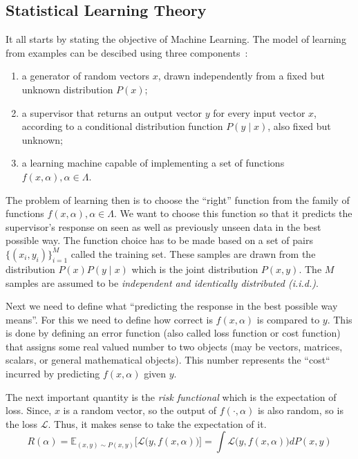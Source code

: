 \documentclass[11pt]{article}
\begin{document}
\subsection{Statistical Learning Theory}
It all starts by stating the objective of Machine Learning. The model of
learning from examples can be descibed using three components~\cite{slt}:
\begin{enumerate}
    \item a generator of random vectors $x$, drawn independently from a fixed
        but unknown distribution $P(x)$;
    \item a supervisor that returns an output vector $y$ for every input vector
        $x$, according to a conditional distribution function $P(y\;\lvert\;x)$,
        also fixed but unknown;
    \item a learning machine capable of implementing a set of functions
        $f(x,\alpha), \alpha\in\Lambda$.
\end{enumerate}
The problem of learning then is to choose the ``right'' function from the family
of functions $f(x,\alpha), \alpha\in\Lambda$. We want to choose this function so
that it predicts the supervisor's response on seen as well as previously unseen
data in the best possible way. The function choice has to be made based on a set
of pairs $\{(x_i,y_i)\}_{i=1}^M$ called the training set. These samples are
drawn from the distribution $P(x)P(y\;\lvert\;x)$ which is the joint
distribution $P(x,y)$. The $M$ samples are assumed to be {\em independent and
identically distributed (i.i.d.)}.\par
Next we need to define what ``predicting the response in the best possible way
means''. For this we need to define how correct is $f(x,\alpha)$ is compared to
$y$. This is done by defining an error function (also called loss function or
cost function) that assigns some real valued number to two objects (may be
vectors, matrices, scalars, or general mathematical objects). This number
represents the ``cost`` incurred by predicting $f(x,\alpha)$ given $y$.\par
The next important quantity is the {\em risk functional} which is the
expectation of loss. Since, $x$ is a random vector, so the output of
$f(\cdot,\alpha)$ is also random, so is the loss $\mathcal{L}$. Thus, it makes
sense to take the expectation of it.
\begin{equation}
    R(\alpha)=\mathbb{E}_{(x,y)\sim
    P(x,y)}\biggl[\mathcal{L}\bigl(y,f(x,\alpha)\bigr)\biggr]=\int
    \mathcal{L}\bigl(y,f(x,\alpha)\bigr)dP(x,y)
\end{equation}
\end{document}
